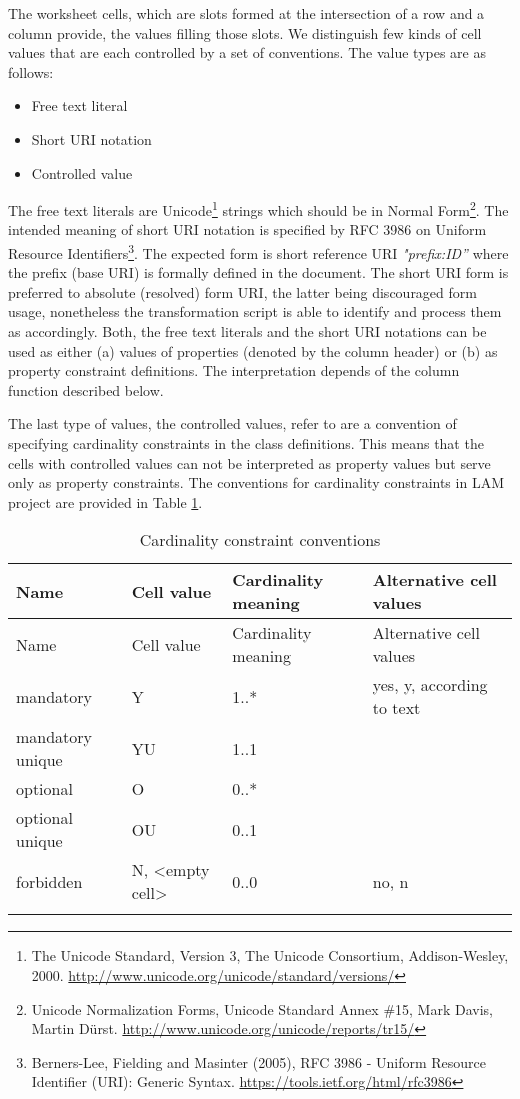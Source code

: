 The worksheet cells, which are slots formed at the intersection of a row
and a column provide, the values filling those slots. We distinguish few
kinds of cell values that are each controlled by a set of conventions. The value
types are as follows:

\begin{itemize}

\item
  Free text literal
\item
  Short URI notation
\item
  Controlled value
\end{itemize}

The free text literals are
Unicode\footnote{The Unicode Standard,
	Version 3, The Unicode Consortium, Addison-Wesley, 2000.
	\mbox{\url{http://www.unicode.org/unicode/standard/versions/}} } strings which
should be in Normal Form\footnote{Unicode Normalization
	Forms, Unicode Standard Annex \#15, Mark Davis, Martin Dürst.
	\href{http://www.unicode.org/unicode/reports/tr15/\%20}{http://www.unicode.org/unicode/reports/tr15/}}. The intended meaning
of short URI notation is specified by RFC 3986 on Uniform Resource
Identifiers\footnote{Berners-Lee, Fielding
	and Masinter (2005), RFC 3986 - Uniform Resource Identifier (URI):
	Generic Syntax. \url{https://tools.ietf.org/html/rfc3986}}. The
expected form is short reference URI \emph{"prefix:ID'' } where the
prefix (base URI) is formally defined in the document. The short URI
form is preferred to absolute (resolved) form URI, the latter being
discouraged form usage, nonetheless the transformation script is able to
identify and process them as accordingly. Both, the free text literals
and the short URI notations can be used as either (a) values of
properties (denoted by the column header) or (b) as property constraint
definitions. The interpretation depends of the column function described
below.

The last type of values, the controlled values, refer to are a
convention of specifying cardinality constraints in the class
definitions. This means that the cells with controlled values can not be
interpreted as property values but serve only as property constraints.
The conventions for cardinality constraints in LAM project are provided
in Table \ref{tab:cardinality}.

\begin{longtable}[!ht]{@{}p{3.4cm}p{3cm}p{2cm}p{4.5cm}@{}}
\toprule
Name & Cell value & Cardinality meaning & Alternative cell
values\tabularnewline
\midrule
\endfirsthead
\toprule
Name & Cell value & Cardinality meaning & Alternative cell
values\tabularnewline
\midrule
\endhead
mandatory & Y & 1..* & yes, y, according to text\tabularnewline
mandatory unique & YU & 1..1 &\tabularnewline
optional & O & 0..* &\tabularnewline
optional unique & OU & 0..1 &\tabularnewline
forbidden & N, \textless{}empty cell\textgreater{} & 0..0 & no,
n\tabularnewline
\bottomrule
\caption{Cardinality constraint conventions}
\label{tab:cardinality}
\vspace{-10pt}
\end{longtable}

